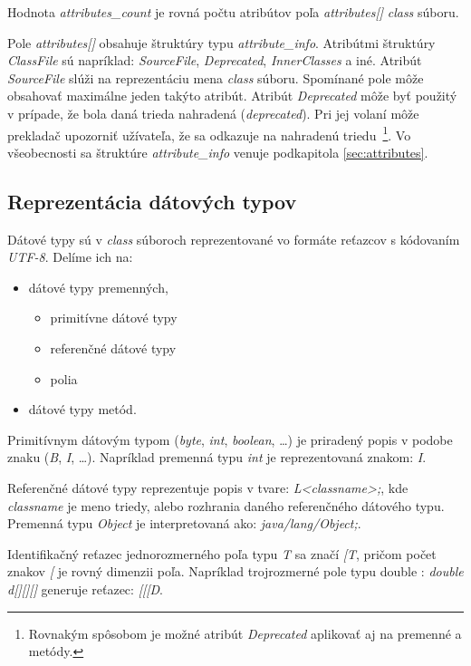 \documentclass[11pt,final,oneside]{fithesis}
\begin{document}
Hodnota \textit{attributes\_count} je rovná počtu atribútov poľa
\textit{attributes[]} \textit{class} súboru.

Pole \textit{attributes[]} obsahuje štruktúry typu \textit{attribute\_info}.
Atribútmi štruktúry \textit{ClassFile} sú napríklad: \textit{SourceFile},
\textit{Deprecated}, \textit{InnerClasses} a iné. Atribút \textit{SourceFile} 
slúži na reprezentáciu mena \textit{class} súboru. Spomínané pole môže 
obsahovať maximálne jeden takýto atribút. Atribút
\textit{Deprecated} môže byť použitý v prípade, že bola daná trieda nahradená
(\textit{deprecated}). Pri jej volaní môže prekladač upozorniť 
užívateľa, že sa odkazuje na nahradenú triedu~\footnote{Rovnakým spôsobom je
možné atribút \textit{Deprecated} aplikovať aj na premenné a metódy.}. Vo
všeobecnosti sa štruktúre \textit{attribute\_info} venuje
podkapitola \ref{sec:attributes}.

\subsection{Reprezentácia dátových typov}
\label{sec:descriptors}
Dátové typy sú v \textit{class} súboroch reprezentované vo formáte reťazcov
s kódovaním \textit{UTF-8}. Delíme ich na:
\begin{itemize}
\item dátové typy premenných,
\begin{itemize}
\item primitívne dátové typy
\item referenčné dátové typy
\item polia
\end{itemize}
\item dátové typy metód.
\end{itemize}

Primitívnym dátovým typom (\textit{byte}, \textit{int}, \textit{boolean}, …) 
je priradený popis v podobe znaku (\textit{B}, \textit{I}, …). Napríklad 
premenná typu \textit{int} je reprezentovaná znakom: \textit{I}.

Referenčné dátové typy reprezentuje popis v tvare: \textit{L<classname>;}, kde 
\textit{classname} je meno triedy, alebo rozhrania daného referenčného
dátového typu. Premenná typu \textit{Object} je interpretovaná ako:
\textit{java/lang/Object;}. 

Identifikačný reťazec jednorozmerného poľa typu \textit{T} sa značí
\textit{[T}, pričom počet znakov \textit{[} je rovný dimenzii poľa. Napríklad
trojrozmerné pole typu double : \textit{double d[][][]} generuje reťazec:
\textit{[[[D}.
\end{document}
